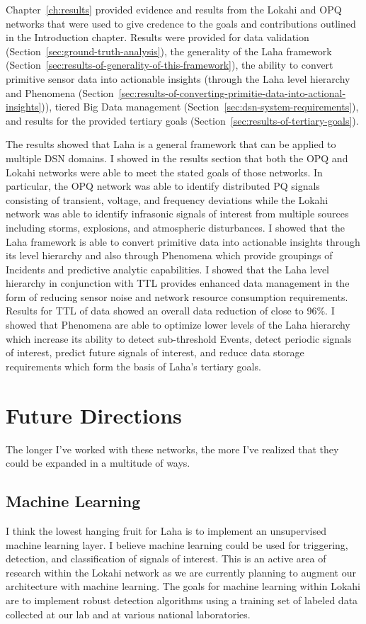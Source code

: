 Chapter~\ref{ch:results} provided evidence and results from the Lokahi and OPQ networks that were used to give credence to the goals and contributions outlined in the Introduction chapter. Results were provided for data validation (Section~\ref{sec:ground-truth-analysis}), the generality of the Laha framework (Section~\ref{sec:results-of-generality-of-this-framework}), the ability to convert primitive sensor data into actionable insights (through the Laha level hierarchy and Phenomena (Section~\ref{sec:results-of-converting-primitie-data-into-actional-insights})), tiered Big Data management (Section~\ref{sec:dsn-system-requirements}), and results for the provided tertiary goals (Section~\ref{sec:results-of-tertiary-goals}).

The results showed that Laha is a general framework that can be applied to multiple DSN domains. I showed in the results section that both the OPQ and Lokahi networks were able to meet the stated goals of those networks. In particular, the OPQ network was able to identify distributed PQ signals consisting of transient, voltage, and frequency deviations while the Lokahi network was able to identify infrasonic signals of interest from multiple sources including storms, explosions, and atmospheric disturbances. I showed that the Laha framework is able to convert primitive data into actionable insights through its level hierarchy and also through Phenomena which provide groupings of Incidents and predictive analytic capabilities. I showed that the Laha level hierarchy in conjunction with TTL provides enhanced data management in the form of reducing sensor noise and network resource consumption requirements. Results for TTL of data showed an overall data reduction of close to 96\%. I showed that Phenomena are able to optimize lower levels of the Laha hierarchy which increase its ability to detect sub-threshold Events, detect periodic signals of interest, predict future signals of interest, and reduce data storage requirements which form the basis of Laha's tertiary goals.

\section{Future Directions}\label{sec:future-directions}

The longer I've worked with these networks, the more I've realized that they could be expanded in a multitude of ways.

\subsection{Machine Learning}\label{subsec:machine-learning}
I think the lowest hanging fruit for Laha is to implement an unsupervised machine learning layer. I believe machine learning could be used for triggering, detection, and classification of signals of interest. This is an active area of research within the Lokahi network as we are currently planning to augment our architecture with machine learning. The goals for machine learning within Lokahi are to implement robust detection algorithms using a training set of labeled data collected at our lab and at various national laboratories.

